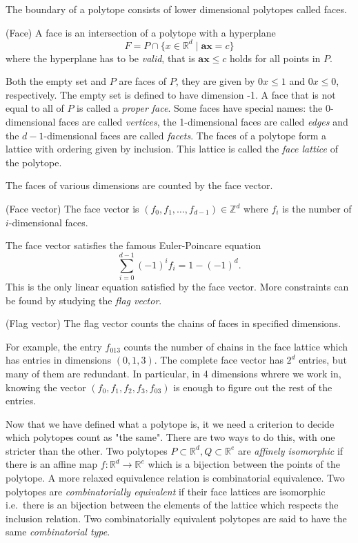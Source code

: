  The boundary 
of a polytope consists of lower dimensional polytopes called faces. 
\begin{definition}
 (Face) A face is an intersection of a polytope with a hyperplane 
\begin{equation}
 F = P \cap \{x \in \mathbb{R}^d \mid \mathbf{a}\mathbf{x} = c\}
\end{equation}
where the hyperplane has to be \textit{valid}, that is $\mathbf{a}\mathbf{x} 
\leq c$ holds for all points in $P$. 

\end{definition}
Both the empty set and $P$ are faces of $P$, they are given by $0x \le 1$ and $0x \le 0$, respectively.
The empty set is defined to have dimension -1.
A face that is not equal to all of $P$ is called a \textit{proper face}.
Some faces have special names: the 0-dimensional faces are called 
\textit{vertices}, the 1-dimensional faces are called \textit{edges} and the 
$d-1$-dimensional faces are called \textit{facets}.
 The faces of a polytope 
form a lattice with ordering given by inclusion. This lattice is called the 
\textit{face lattice} of the polytope.

The faces of various dimensions 
are counted by the face vector.
\begin{definition}
 (Face vector) The face vector is $(f_0, f_1, \dots, f_{d-1}) \in \mathbb{Z}^d$ 
where $f_i$ is 
the number of $i$-dimensional faces.
\end{definition}
The face vector satisfies the famous Euler-Poincare equation
\begin{equation}
 \sum_{i=0}^{d-1} (-1)^i f_i = 1 - (-1)^d.
\end{equation}
This is the only linear equation satisfied by the face vector. More 
constraints can be found by studying the \textit{flag vector}.

\begin{definition}
 (Flag vector) The flag vector counts the chains of faces in specified 
dimensions.
\end{definition}

For example, the entry $f_{013}$ counts the number of chains in the face 
lattice which has entries in dimensions $(0,1,3)$. The complete face vector has $2^d$ entries,
but many of them are redundant. In particular, in 4 dimensions whrere we work in,
knowing the vector $(f_0, f_1, f_2, f_3, f_{03})$ is enough to figure out the rest of the entries. 

Now that we have defined what a polytope is, it we need a criterion to decide which polytopes 
count as "the same". There are two ways to do this, with one stricter than the other.
Two polytopes $P\subset \mathbb{R}^d, Q \subset \mathbb{R}^e$ are 
\textit{affinely isomorphic} if there is an affine map $f: \mathbb{R}^d 
\rightarrow \mathbb{R}^e$ which is a bijection between the points of the 
polytope. A more relaxed equivalence relation is combinatorial equivalence. Two 
polytopes are \textit{combinatorially equivalent} if their face lattices are isomorphic 
i.e.\ there is an bijection between the elements of the lattice which respects 
the inclusion relation. Two combinatorially equivalent polytopes are said to have the 
same \textit{combinatorial type}. 

